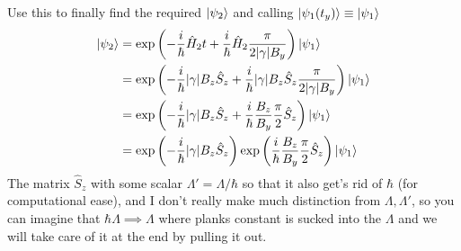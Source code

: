 \documentclass[letter, 10pts]{article}
\newcommand{\hb}{\hbar}
\begin{document}
Use this to finally find the required $\ket{\psi_2}$ and calling $\ket{\psi_1(t_y)} \equiv \ket{\psi_1}$
\begin{align*}
	\ket{\psi_2} &= 
\exp
\left(
- \frac{i}{\hb} \hat{H}_2 t + \frac{i}{\hb} \hat{H}_2 \frac{\pi }{2 |\gamma| B_y}
\right) \ket{\psi_1}
	\\
	&= 
\exp
\left(
- \frac{i}{\hb} |\gamma| B_z \hat{S}_z 
+ \frac{i}{\hb} |\gamma| B_z \hat{S}_z \frac{\pi }{2 | \gamma | B_y} 
\right) \ket{\psi_1}
	\\
	&= 
\exp
\left(
- \frac{i}{\hb} |\gamma| B_z \hat{S}_z 
+ \frac{i}{\hb} \frac{B_z}{B_y} \frac{\pi }{2} \hat{S}_z 
\right) \ket{\psi_1}
	\\
	&= 
\exp
\left( 
- \frac{i}{\hb} |\gamma| B_z \hat{S}_z  \right) \exp \left(
 \frac{i}{\hb} \frac{B_z}{B_y} \frac{\pi }{2} \hat{S}_z 
\right) \ket{\psi_1}
	\\
\end{align*}
The matrix $\hat{S}_z$ with some scalar $\Lambda ' = \Lambda / \hb$ so that it also get's rid of $\hb$ (for computational ease), and I don't really make much distinction from $\Lambda, \Lambda'$, so you can imagine that $ \hb \Lambda \implies \Lambda$ where planks constant is sucked into the $\Lambda$ and we will take care of it at the end by pulling it out.  
\end{document}
